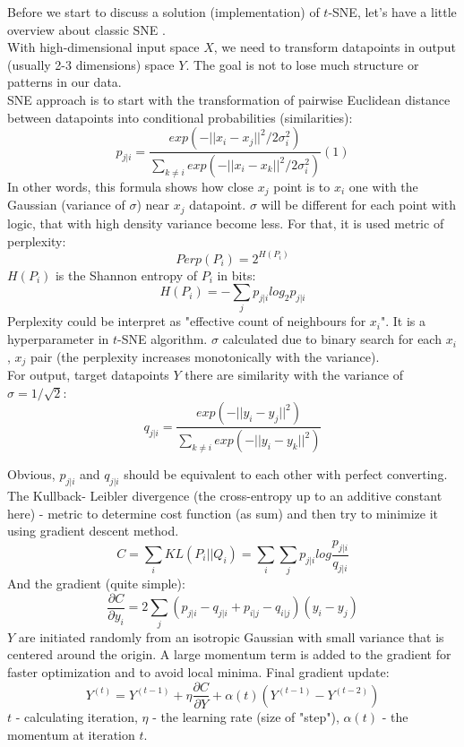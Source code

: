 Before we start to discuss a solution (implementation) of $t$-SNE, let's have a little overview about classic SNE \cite{snearticle}.\\
With high-dimensional input space $X$, we need to transform datapoints in output (usually 2-3 dimensions) space $Y$. The goal is not to lose much structure or patterns in our data.\\
SNE approach is to start with the transformation of pairwise Euclidean distance between datapoints into conditional probabilities (similarities):
\begin{equation}
    p_{j|i} = \frac{exp(-||x_i - x_j||^2 / 2 \sigma_i^2)}{\sum_{k \ne i}{exp(-||x_i - x_k||^2 / 2 \sigma_i^2)}} (1)
\end{equation}
In other words, this formula shows how close $x_j$ point is to $x_i$ one with the Gaussian (variance of $\sigma$) near $x_j$ datapoint. $\sigma$ will be different for each point with logic, that with high density variance become less. For that, it is used metric of perplexity:
$$ Perp(P_i) = 2^{H(P_i)} $$
$H(P_i)$ is the Shannon entropy of $P_i$ in bits:
\begin{equation}
    H(P_i) = -\sum_j{}p_{j|i} log_2{p_{j|i}}
\end{equation}
Perplexity could be interpret as "effective count of neighbours for $x_i$". It is a hyperparameter in $t$-SNE algorithm. $\sigma$ calculated due to binary search for each $x_i$, $x_j$ pair (the perplexity increases monotonically with the variance).\\
For output, target datapoints $Y$ there are similarity with the variance of $\sigma = 1/\sqrt{2}$:
$$ q_{j|i} = \frac{exp(-||y_i - y_j||^2)}{\sum_{k \ne i}{exp(-||y_i - y_k||^2)}} $$

Obvious, $p_{j|i}$ and $q_{j|i}$ should be equivalent to each other with perfect converting. The Kullback-
Leibler divergence (the cross-entropy up to an additive constant here) - metric to determine cost function (as sum) and then try to minimize it using gradient descent method.
\begin{equation}
    C = \sum_i{KL(P_i||Q_i)} = \sum_i{\sum_j{p_{j|i}log{\frac{p_{j|i}}{q_{j|i}}}}}
\end{equation}
And the gradient (quite simple):
$$ \frac{\partial C}{\partial y_i} = 2 \sum_j{(p_{j|i} - q_{j|i} + p_{i|j} - q_{i|j})(y_i - y_j)} $$
$Y$ are initiated randomly from an isotropic Gaussian with small variance that is centered around the origin. A large momentum term is added to the gradient for faster optimization and to avoid local minima. Final gradient update:\\
$$ Y^{(t)} = Y^{(t-1)} + \eta \frac{\partial C}{\partial Y} + \alpha(t)(Y^{(t-1)} - Y^{(t-2)})$$
$t$ - calculating iteration, $\eta$ - the learning rate (size of "step"), $\alpha(t)$ - the momentum at iteration $t$.\\

